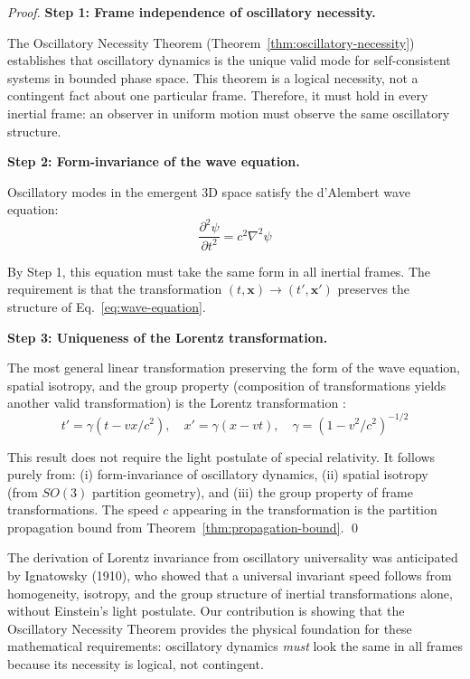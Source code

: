 \begin{proof}
\textbf{Step 1: Frame independence of oscillatory necessity.}

The Oscillatory Necessity Theorem (Theorem~\ref{thm:oscillatory-necessity}) establishes that oscillatory dynamics is the unique valid mode for self-consistent systems in bounded phase space. This theorem is a logical necessity, not a contingent fact about one particular frame. Therefore, it must hold in every inertial frame: an observer in uniform motion must observe the same oscillatory structure.

\textbf{Step 2: Form-invariance of the wave equation.}

Oscillatory modes in the emergent 3D space satisfy the d'Alembert wave equation:
\begin{equation}
    \frac{\partial^2 \psi}{\partial t^2} = c^2 \nabla^2 \psi
    \label{eq:wave-equation}
\end{equation}

By Step 1, this equation must take the same form in all inertial frames. The requirement is that the transformation $(t, \mathbf{x}) \to (t', \mathbf{x}')$ preserves the structure of Eq.~\eqref{eq:wave-equation}.

\textbf{Step 3: Uniqueness of the Lorentz transformation.}

The most general linear transformation preserving the form of the wave equation, spatial isotropy, and the group property (composition of transformations yields another valid transformation) is the Lorentz transformation \citep{ignatowsky1910,frank1911}:
\begin{equation}
    t' = \gamma(t - vx/c^2), \quad x' = \gamma(x - vt), \quad \gamma = (1 - v^2/c^2)^{-1/2}
\end{equation}

This result does not require the light postulate of special relativity. It follows purely from: (i) form-invariance of oscillatory dynamics, (ii) spatial isotropy (from $SO(3)$ partition geometry), and (iii) the group property of frame transformations. The speed $c$ appearing in the transformation is the partition propagation bound from Theorem~\ref{thm:propagation-bound}. \qed
\end{proof}

\begin{remark}
The derivation of Lorentz invariance from oscillatory universality was anticipated by Ignatowsky (1910), who showed that a universal invariant speed follows from homogeneity, isotropy, and the group structure of inertial transformations alone, without Einstein's light postulate. Our contribution is showing that the Oscillatory Necessity Theorem provides the physical foundation for these mathematical requirements: oscillatory dynamics \textit{must} look the same in all frames because its necessity is logical, not contingent.
\end{remark}

